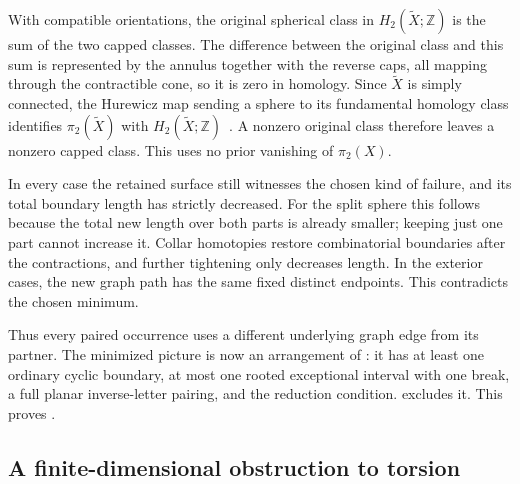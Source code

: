With compatible orientations, the original spherical class in \(H_2(\widetilde X;\mathbb Z)\) is the sum of the two capped classes. The difference between the original class and this sum is represented by the annulus together with the reverse caps, all mapping through the contractible cone, so it is zero in homology. Since \(\widetilde X\) is simply connected, the Hurewicz map sending a sphere to its fundamental homology class identifies \(\pi_2(\widetilde X)\) with \(H_2(\widetilde X;\mathbb Z)\)~\cite[Theorem~4.37]{Hatcher2002}. A nonzero original class therefore leaves a nonzero capped class. This uses no prior vanishing of \(\pi_2(X)\).

In every case the retained surface still witnesses the chosen kind of failure, and its total boundary length has strictly decreased. For the split sphere this follows because the total new length over both parts is already smaller; keeping just one part cannot increase it. Collar homotopies restore combinatorial boundaries after the contractions, and further tightening only decreases length. In the exterior cases, the new graph path has the same fixed distinct endpoints. This contradicts the chosen minimum.

Thus every paired occurrence uses a different underlying graph edge from its partner. The minimized picture is now an arrangement of : it has at least one ordinary cyclic boundary, at most one rooted exceptional interval with one break, a full planar inverse-letter pairing, and the reduction condition.  excludes it. This proves .

\subsection{A finite-dimensional obstruction to torsion}


